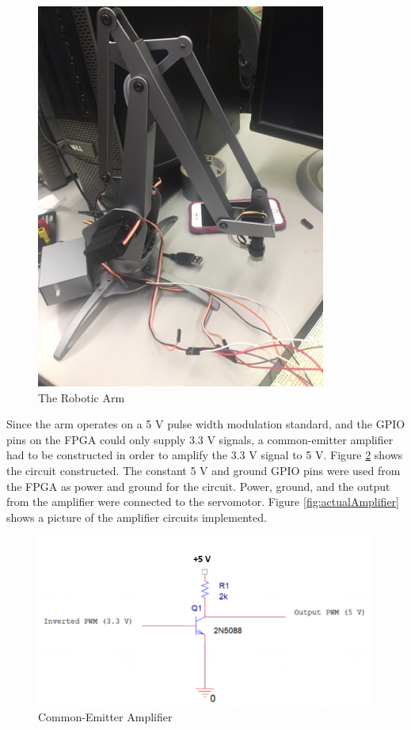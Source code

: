 \documentclass{article}
\begin{document}
        \begin{figure}[H]
            \centering
            \includegraphics[scale=0.6]{arm.jpg}
            \caption{The Robotic Arm}
            \label{fig:actualArm}
        \end{figure}
       
       Since the arm operates on a 5 V pulse width modulation standard, and the GPIO pins on the FPGA could only supply 3.3 V signals, a common-emitter amplifier had to be constructed in order to amplify the 3.3 V signal to  5 V. Figure \ref{fig:amplifier} shows the circuit constructed. The constant 5 V and ground GPIO pins were used from the FPGA as power and ground for the circuit. Power, ground, and the output from the amplifier were connected to the servomotor. Figure \ref{fig:actualAmplifier} shows a picture of the amplifier circuits implemented.
       
       \begin{figure}[H]
            \begin{center}
                \includegraphics[scale=1]{amplifier.PNG}
                \caption{Common-Emitter Amplifier}
                \label{fig:amplifier}
            \end{center}
        \end{figure}
        
\end{document}
